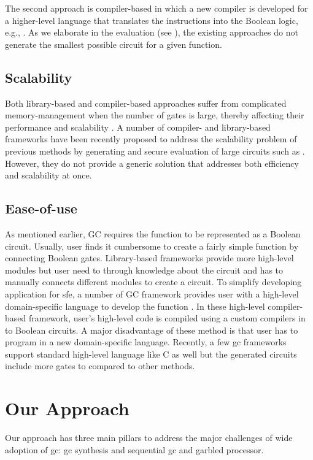 The second approach is compiler-based in which a new compiler is developed for a higher-level language that translates the instructions into the Boolean logic, e.g., \cite{malkhi2004fairplay,kreuter2012billion,kreuter2013pcf,franz2014cbmc}.
As we elaborate in the evaluation (see ), the existing approaches do not generate the smallest possible circuit for a given function.

\subsection{Scalability}
Both library-based and compiler-based approaches suffer from complicated memory-management when the number of gates is large, thereby affecting their performance and scalability \cite{henecka2013faster, kreuter2013pcf}.
A number of compiler- and library-based frameworks have been recently proposed to address the scalability problem of previous methods by generating and secure evaluation of large circuits such as \cite{malka2011vmcrypt, mood2012memory, kreuter2012billion, kreuter2013pcf}.
However, they do not provide a generic solution that addresses both efficiency and scalability at once.

\subsection{Ease-of-use}
As mentioned earlier, GC requires the function to be represented as a Boolean circuit.
Usually, user finds it cumbersome to create a fairly simple function by connecting Boolean gates.
Library-based frameworks provide more high-level modules but user need to through knowledge about the circuit and has to manually connects different modules to create a circuit.
To simplify developing application for sfe, a number of GC framework provides user with a high-level domain-specific language to develop the function \cite{mood2012memory,kreuter2012billion,kreuter2013pcf,liu2015oblivm}.
In these high-level compiler-based framework, user's high-level code is compiled using a custom compilers in to Boolean circuits.
A major disadvantage of these method is that user has to program in a new domain-specific language.
Recently, a few gc frameworks support standard high-level language like C as well \cite{holzer2012secure, franz2014cbmc, zahur2015obliv, mood2016frigate} but the generated circuits include more gates to compared to other methods.

\section{Our Approach}
Our approach has three main pillars to address the major challenges of wide adoption of gc: gc synthesis and sequential gc and garbled processor.

